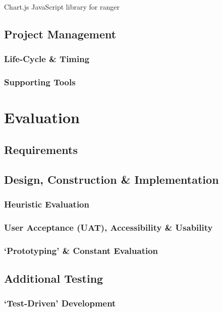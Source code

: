 \documentclass[11pt, english]{article}
\begin{document}
		Chart.js JavaScript library for ranger

	\subsection{Project Management}

		\subsubsection{Life-Cycle \& Timing}

		\subsubsection{Supporting Tools}

\newpage

\section{Evaluation}\label{ch7}

	\subsection{Requirements}

	\subsection{Design, Construction \& Implementation}

		\subsubsection{Heuristic Evaluation}

		\subsubsection{User Acceptance (UAT), Accessibility \& Usability}

		\subsubsection{`Prototyping' \& Constant Evaluation}

	\subsection{Additional Testing}

		\subsubsection{`Test-Driven' Development}
\end{document}
